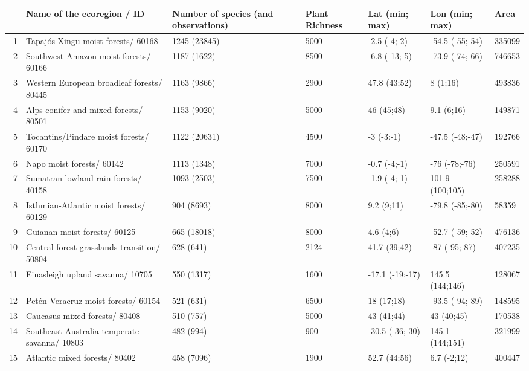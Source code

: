 \begin{table}[ht]
\centering
\begin{tabular}{rllllll}
  \hline
 & Name of the ecoregion / ID & Number of species (and observations) & Plant Richness & Lat (min; max) & Lon (min; max) & Area \\ 
  \hline
1 & Tapajós-Xingu moist forests/ 60168 & 1245 (23845) & 5000 & -2.5 (-4;-2) & -54.5 (-55;-54) & 335099 \\ 
  2 & Southwest Amazon moist forests/ 60166 & 1187 (1622) & 8500 & -6.8 (-13;-5) & -73.9 (-74;-66) & 746653 \\ 
  3 & Western European broadleaf forests/ 80445 & 1163 (9866) & 2900 & 47.8 (43;52) & 8 (1;16) & 493836 \\ 
  4 & Alps conifer and mixed forests/ 80501 & 1153 (9020) & 5000 & 46 (45;48) & 9.1 (6;16) & 149871 \\ 
  5 & Tocantins/Pindare moist forests/ 60170 & 1122 (20631) & 4500 & -3 (-3;-1) & -47.5 (-48;-47) & 192766 \\ 
  6 & Napo moist forests/ 60142 & 1113 (1348) & 7000 & -0.7 (-4;-1) & -76 (-78;-76) & 250591 \\ 
  7 & Sumatran lowland rain forests/ 40158 & 1093 (2503) & 7500 & -1.9 (-4;-1) & 101.9 (100;105) & 258288 \\ 
  8 & Isthmian-Atlantic moist forests/ 60129 & 904 (8693) & 8000 & 9.2 (9;11) & -79.8 (-85;-80) & 58359 \\ 
  9 & Guianan moist forests/ 60125 & 665 (18018) & 8000 & 4.6 (4;6) & -52.7 (-59;-52) & 476136 \\ 
  10 & Central forest-grasslands transition/ 50804 & 628 (641) & 2124 & 41.7 (39;42) & -87 (-95;-87) & 407235 \\ 
  11 & Einasleigh upland savanna/ 10705 & 550 (1317) & 1600 & -17.1 (-19;-17) & 145.5 (144;146) & 128067 \\ 
  12 & Petén-Veracruz moist forests/ 60154 & 521 (631) & 6500 & 18 (17;18) & -93.5 (-94;-89) & 148595 \\ 
  13 & Caucasus mixed forests/ 80408 & 510 (757) & 5000 & 43 (41;44) & 43 (40;45) & 170538 \\ 
  14 & Southeast Australia temperate savanna/ 10803 & 482 (994) & 900 & -30.5 (-36;-30) & 145.1 (144;151) & 321999 \\ 
  15 & Atlantic mixed forests/ 80402 & 458 (7096) & 1900 & 52.7 (44;56) & 6.7 (-2;12) & 400447 \\ 

\end{tabular}
\end{table}
